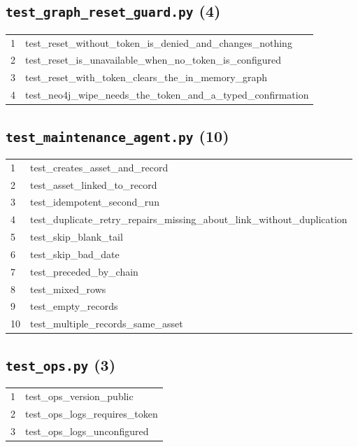 \subsection*{\texttt{test\_graph\_reset\_guard.py} (4)}
\begin{longtable}{p{}p{}}
1 & test\_reset\_without\_token\_is\_denied\_and\_changes\_nothing \\
2 & test\_reset\_is\_unavailable\_when\_no\_token\_is\_configured \\
3 & test\_reset\_with\_token\_clears\_the\_in\_memory\_graph \\
4 & test\_neo4j\_wipe\_needs\_the\_token\_and\_a\_typed\_confirmation \\
\end{longtable}
\subsection*{\texttt{test\_maintenance\_agent.py} (10)}
\begin{longtable}{p{}p{}}
1 & test\_creates\_asset\_and\_record \\
2 & test\_asset\_linked\_to\_record \\
3 & test\_idempotent\_second\_run \\
4 & test\_duplicate\_retry\_repairs\_missing\_about\_link\_without\_duplication \\
5 & test\_skip\_blank\_tail \\
6 & test\_skip\_bad\_date \\
7 & test\_preceded\_by\_chain \\
8 & test\_mixed\_rows \\
9 & test\_empty\_records \\
10 & test\_multiple\_records\_same\_asset \\
\end{longtable}
\subsection*{\texttt{test\_ops.py} (3)}
\begin{longtable}{p{}p{}}
1 & test\_ops\_version\_public \\
2 & test\_ops\_logs\_requires\_token \\
3 & test\_ops\_logs\_unconfigured \\
\end{longtable}
